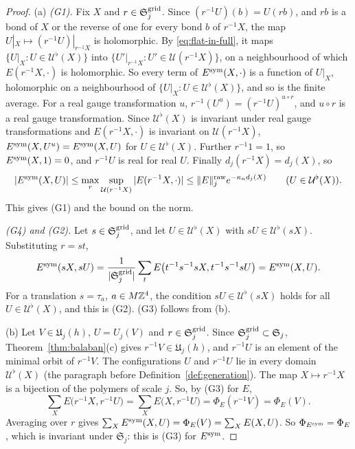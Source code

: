 \begin{proof}
(a) \emph{(G1).} Fix $X$ and $r\in\mathfrak S^{\rm grid}_j$. Since $(r^{-1}U)(b)=U(rb)$, and $rb$ is a bond of $X$ or the reverse of one for every bond $b$ of $r^{-1}X$, the map $U|_X\mapsto(r^{-1}U)|_{r^{-1}X}$ is holomorphic. By \eqref{eq:flat-in-full}, it maps $\{U|_X:U\in\mathcal U^\flat(X)\}$ into $\{U'|_{r^{-1}X}:U'\in\mathcal U(r^{-1}X)\}$, on a neighbourhood of which $E(r^{-1}X,\cdot)$ is holomorphic. So every term of $E^{\rm sym}(X,\cdot)$ is a function of $U|_X$, holomorphic on a neighbourhood of $\{U|_X:U\in\mathcal U^\flat(X)\}$, and so is the finite average. For a real gauge transformation $u$, $r^{-1}(U^u)=(r^{-1}U)^{u\circ r}$, and $u\circ r$ is a real gauge transformation. Since $\mathcal U^\flat(X)$ is invariant under real gauge transformations and $E(r^{-1}X,\cdot)$ is invariant on $\mathcal U(r^{-1}X)$, $E^{\rm sym}(X,U^u)=E^{\rm sym}(X,U)$ for $U\in\mathcal U^\flat(X)$. Further $r^{-1}1=1$, so $E^{\rm sym}(X,1)=0$, and $r^{-1}U$ is real for real $U$. Finally $d_j(r^{-1}X)=d_j(X)$, so
\[
|E^{\rm sym}(X,U)|\le\max_r\sup_{\mathcal U(r^{-1}X)}|E(r^{-1}X,\cdot)|\le\|E\|^{\rm raw}_je^{-\kappa_nd_j(X)}\qquad(U\in\mathcal U^\flat(X)).
\]
This gives (G1) and the bound on the norm.

\emph{(G4) and (G2).} Let $s\in\mathfrak S^{\rm grid}_j$, and let $U\in\mathcal U^\flat(X)$ with $sU\in\mathcal U^\flat(sX)$. Substituting $r=st$,
\[
E^{\rm sym}(sX,sU)=\frac1{|\mathfrak S^{\rm grid}_j|}\sum_tE\big(t^{-1}s^{-1}sX,t^{-1}s^{-1}sU\big)=E^{\rm sym}(X,U).
\]
For a translation $s=\tau_a$, $a\in M\mathbb Z^4$, the condition $sU\in\mathcal U^\flat(sX)$ holds for all $U\in\mathcal U^\flat(X)$, and this is (G2). (G3) follows from (b).

(b) Let $V\in\mathfrak U_j(h)$, $U=U_j(V)$ and $r\in\mathfrak S^{\rm grid}_j$. Since $\mathfrak S^{\rm grid}_j\subset\mathfrak S_j$, Theorem~\ref{thm:balaban}(c) gives $r^{-1}V\in\mathfrak U_j(h)$, and $r^{-1}U$ is an element of the minimal orbit of $r^{-1}V$. The configurations $U$ and $r^{-1}U$ lie in every domain $\mathcal U^\flat(X)$ (the paragraph before Definition~\ref{def:generation}). The map $X\mapsto r^{-1}X$ is a bijection of the polymers of scale $j$. So, by (G3) for $E$,
\[
\sum_XE\big(r^{-1}X,r^{-1}U\big)=\sum_XE\big(X,r^{-1}U\big)=\Phi_E(r^{-1}V)=\Phi_E(V).
\]
Averaging over $r$ gives $\sum_XE^{\rm sym}(X,U)=\Phi_E(V)=\sum_XE(X,U)$. So $\Phi_{E^{\rm sym}}=\Phi_E$, which is invariant under $\mathfrak S_j$: this is (G3) for $E^{\rm sym}$.


\end{proof}
